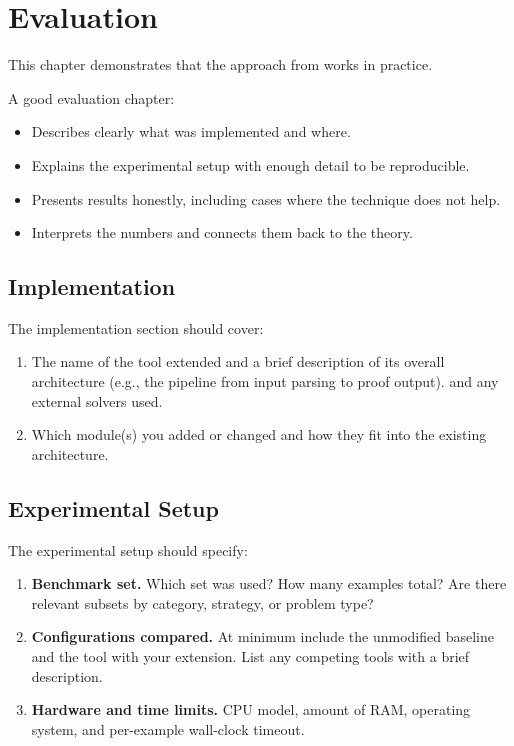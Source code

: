 \chapter{Evaluation}
\label{ch:evaluation}

This chapter demonstrates that the approach from 
works in practice.

A good evaluation chapter:
\begin{itemize}
      \item Describes clearly what was implemented and where.
      \item Explains the experimental setup with enough detail to be reproducible.
      \item Presents results honestly, including cases where the technique does not help.
      \item Interprets the numbers and connects them back to the theory.
\end{itemize}

\section{Implementation}\label{sec:implementation}

The implementation section should cover:
\begin{enumerate}
    \item The name of the tool extended and a brief description of its overall
          architecture (e.g., the pipeline from input parsing to proof output). 
          and any external solvers used.
    \item Which module(s) you added or changed and how they fit into the existing 
          architecture.
\end{enumerate}

\section{Experimental Setup}\label{sec:setup}

The experimental setup should specify:
\begin{enumerate}
    \item \textbf{Benchmark set.}
          Which set was used?
          How many examples total?  
          Are there relevant subsets by category, strategy, or problem type?

    \item \textbf{Configurations compared.}
          At minimum include the unmodified baseline and the tool with your
          extension. 
          List any competing tools with a brief description.

    \item \textbf{Hardware and time limits.}
          CPU model, amount of RAM, operating system, and per-example
          wall-clock timeout.
\end{enumerate}

